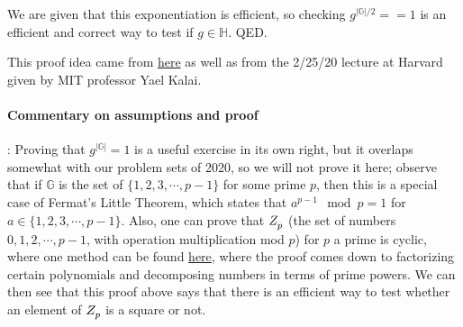 We are given that this exponentiation is efficient, so checking
\(g^{|\mathbb{G}|/2} == 1\) is an efficient and correct way to test if
\(g \in \mathbb{H}\). QED.

This proof idea came from
\href{https://crypto.stanford.edu/pbc/notes/numbertheory/qr.html}{here}
as well as from the 2/25/20 lecture at Harvard given by MIT professor
Yael Kalai.

\paragraph{Commentary on assumptions and proof}: Proving that
\(g^{|\mathbb{G}|}=1\) is a useful exercise in its own right, but it
overlaps somewhat with our problem sets of 2020, so we will not prove it
here; observe that if \(\mathbb{G}\) is the set of
\(\{1,2,3,\cdots,p-1\}\) for some prime \(p\), then this is a special
case of Fermat's Little Theorem, which states that
\(a^{p-1} \mod p = 1\) for \(a \in \{1,2,3,\cdots,p-1\}\). Also, one can
prove that \(Z_p^{\*}\) (the set of numbers \(0,1,2,\cdots,p-1\), with
operation multiplication mod \(p\)) for \(p\) a prime is cyclic, where
one method can be found
\href{https://crypto.stanford.edu/pbc/notes/numbertheory/gen.html}{here},
where the proof comes down to factorizing certain polynomials and
decomposing numbers in terms of prime powers. We can then see that this
proof above says that there is an efficient way to test whether an
element of \(Z_p^{\*}\) is a square or not.
